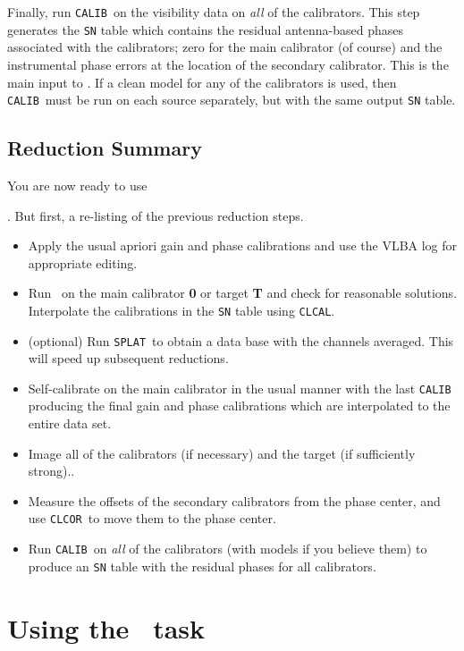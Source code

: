      Finally, run {\tt CALIB}~on the visibility data on {\it all} of
the calibrators.  This step generates the {\tt SN} table which
contains the residual antenna-based phases associated with the
calibrators; zero for the main calibrator (of course) and the
instrumental phase errors at the location of the secondary calibrator.
This is the main input to \ATMCA.  If a clean model for any of the
calibrators is used, then {\tt CALIB}~must be run on each source
separately, but with the same output {\tt SN} table.

\subsection {Reduction Summary}
     You are now ready to use {\ATMCA.  But first, a re-listing of the
previous reduction steps.
\begin {itemize}

\item Apply the usual apriori gain and phase calibrations and use the
VLBA log for appropriate editing.

\item Run \FR~on the main calibrator {\bf 0} or target {\bf T} and
check for reasonable solutions.  Interpolate the calibrations in the
{\tt SN} table using {\tt CLCAL}.

\item (optional) Run {\tt SPLAT}~to obtain a data base with the channels
averaged.  This will speed up subsequent reductions.

\item Self-calibrate on the main calibrator in the usual manner with the
last {\tt CALIB} producing the final gain and phase calibrations which
are interpolated to the entire data set.

\item Image all of the calibrators (if necessary) and the target (if
sufficiently strong)..

\item Measure the offsets of the secondary calibrators from the phase
center, and use {\tt CLCOR}~to move them to the phase center.

\item Run {\tt CALIB}~on {\it all} of the calibrators (with models if
you believe them) to produce an {\tt SN} table with the residual
phases for all calibrators.

\end {itemize}

\section {Using the \AIPS~task \ATMCA}

}

